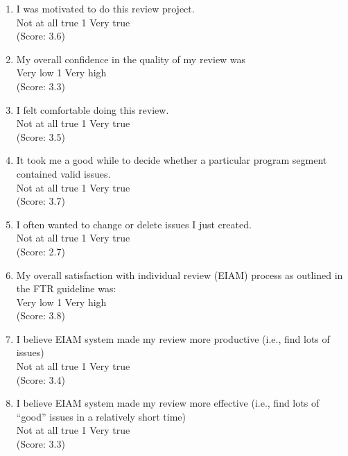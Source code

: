\begin{enumerate}
\item   I was motivated to do this review project.
\\
Not at all true \hfill 1     \hfill Very true\\
(Score: 3.6)

\item  My overall confidence in the quality of my review was
\\
Very low \hfill 1     \hfill Very high\\
(Score: 3.3)

\item  I felt comfortable doing this review.
\\
Not at all true \hfill 1     \hfill Very true\\
(Score: 3.5)

\item  It took me a good while to decide whether a particular program
segment contained valid issues.
\\
Not at all true \hfill 1     \hfill Very true\\
(Score: 3.7)

\item  I often wanted to change or delete issues I just created.
\\
Not at all true \hfill 1     \hfill Very true\\
(Score: 2.7)

\item  My overall satisfaction with individual review (EIAM) process as
outlined in the FTR guideline was:
\\
Very low \hfill 1     \hfill Very high\\
(Score: 3.8)

\item  I believe EIAM system made my review more productive (i.e., find
lots of issues) 
\\
Not at all true \hfill 1     \hfill Very true\\
(Score: 3.4)

\item  I believe EIAM system made my review more effective
(i.e., find lots of ``good'' issues in a relatively short time)
\\
Not at all true \hfill 1     \hfill Very true\\
(Score: 3.3)


\end{enumerate}
